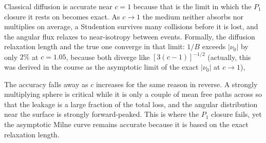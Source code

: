 \documentclass[11pt]{article}
\begin{document}
Classical diffusion is accurate near $c = 1$ because that is the limit in which the $P_1$ closure
it rests on becomes exact. As $c \to 1$ the medium neither absorbs nor multiplies on average, a
Studention survives many collisions before it is lost, and the angular flux relaxes to
near-isotropy between events. Formally, the diffusion relaxation length
and the true one converge in that limit: $1/B$ exceeds $|\nu_0|$ by only $2\%$ at $c = 1.05$,
because both diverge like $[3(c-1)]^{-1/2}$ (actually, this was derived in the course as the asymptotic limit of the exact $|\nu_0|$ at $c\to1$),

The accuracy falls away as $c$ increases for the same reason in reverse. A strongly multiplying
sphere is critical while it is only a couple of mean free paths across so that the leakage is a large fraction of the total loss, and the angular
distribution near the surface is strongly forward-peaked. This is where the $P_1$ closure fails, yet the asymptotic Milne curve remains accurate because it is based on the exact relaxation length.
\end{document}
